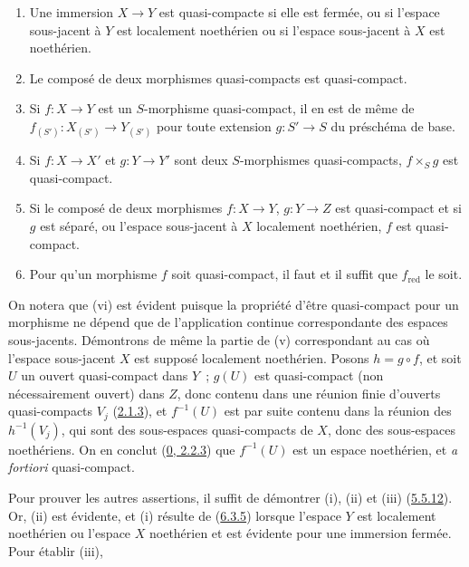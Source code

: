 \begin{proposition}[6.6.4]
\label{I.6.6.4-fr}
\begin{enumerate}
  \item[(i)] Une immersion $X\to Y$ est quasi-compacte si elle est fermée,
    ou si l'espace sous-jacent à $Y$ est localement noethérien ou si l'espace
    sous-jacent à $X$ est noethérien.
  \item[(ii)] Le composé de deux morphismes quasi-compacts est quasi-compact.
  \item[(iii)] Si $f:X\to Y$ est un $S$-morphisme quasi-compact, il en est de
    même de $f_{(S')}:X_{(S')}\to Y_{(S')}$ pour toute extension $g:S'\to S$
    du préschéma de base.
  \item[(iv)] Si $f:X\to X'$ et $g:Y\to Y'$ sont deux $S$-morphismes
    quasi-compacts, $f\times_S g$ est quasi-compact.
  \item[(v)] Si le composé de deux morphismes $f:X\to Y$, $g:Y\to Z$ est
    quasi-compact et si $g$ est séparé, ou l'espace sous-jacent à $X$
    localement noethérien, $f$ est quasi-compact.
  \item[(vi)] Pour qu'un morphisme $f$ soit quasi-compact, il faut et il
    suffit que $f_{\mathrm{red}}$ le soit.
\end{enumerate}
\end{proposition}

On notera que (vi) est évident puisque la propriété d'être quasi-compact pour
un morphisme ne dépend que de l'application continue correspondante des
espaces sous-jacents. Démontrons de même la partie de (v) correspondant au cas
où l'espace sous-jacent $X$ est supposé localement noethérien. Posons
$h=g\circ f$, et soit $U$ un ouvert quasi-compact dans $Y$~; $g(U)$ est
quasi-compact (non nécessairement ouvert) dans $Z$, donc contenu dans une
réunion finie d'ouverts quasi-compacts $V_j$
(\hyperref[I.2.1.3-fr]{2.1.3}), et $f^{-1}(U)$ est par suite contenu dans la
réunion des $h^{-1}(V_j)$, qui sont des sous-espaces quasi-compacts de $X$,
donc des sous-espaces noethériens. On en conclut
(\hyperref[0.2.2.3-fr]{0, 2.2.3}) que $f^{-1}(U)$ est un espace noethérien,
et \emph{a fortiori} quasi-compact.

Pour prouver les autres assertions, il suffit de démontrer (i), (ii) et (iii)
(\hyperref[I.5.5.12-fr]{5.5.12}). Or, (ii) est évidente, et (i) résulte de
(\hyperref[I.6.3.5-fr]{6.3.5}) lorsque l'espace $Y$ est localement noethérien
ou l'espace $X$ noethérien et est évidente pour une immersion fermée. Pour
établir (iii),
